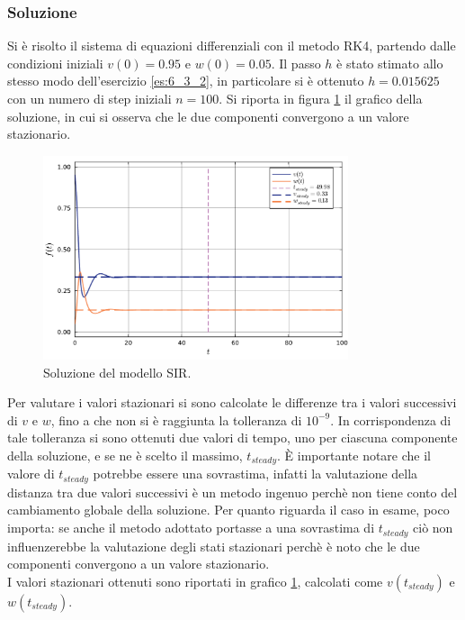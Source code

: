 \documentclass[letterpaper, 12pt]{article}
\numberwithin{equation}{section}    %
\begin{document}
\subsubsection{Soluzione}
Si è risolto il sistema di equazioni differenziali con il metodo RK4, partendo dalle condizioni iniziali
$v(0) = 0.95$ e $w(0) = 0.05$. Il passo $h$ è stato stimato allo stesso modo dell'esercizio \ref{es:6_3_2}, in 
particolare si è ottenuto $h = 0.015625$ con un numero di step iniziali $n = 100$. Si riporta in figura
\ref{fig:es6_3_3} il grafico della soluzione, in cui si osserva che le due componenti 
convergono a un valore stazionario. \\
\begin{figure}
    \centering
    \includegraphics[width=0.8\textwidth]{6331.pdf}
    \caption{Soluzione del modello SIR.}
    \label{fig:es6_3_3}
\end{figure}
Per valutare i valori stazionari si sono calcolate le differenze
tra i valori successivi di $v$ e $w$, fino a che non si è raggiunta la tolleranza di $10^{-9}$. In corrispondenza
di tale tolleranza si sono ottenuti due valori di tempo, uno per ciascuna componente della soluzione, e se 
ne è scelto il massimo, $t_{steady}$.
È importante notare che il valore di $t_{steady}$ potrebbe essere una sovrastima, 
infatti la valutazione della distanza
tra due valori successivi è un metodo ingenuo perchè non tiene conto del cambiamento globale 
della soluzione. Per quanto riguarda il caso in esame, poco importa: se anche il metodo adottato portasse a 
una sovrastima di $t_{steady}$ ciò non influenzerebbe 
la valutazione degli stati stazionari perchè è noto che le due componenti convergono a un valore stazionario. \\
I valori stazionari ottenuti sono riportati in grafico \ref{fig:es6_3_3}, calcolati come $v(t_{steady})$ e 
$w(t_{steady})$.
\end{document}

